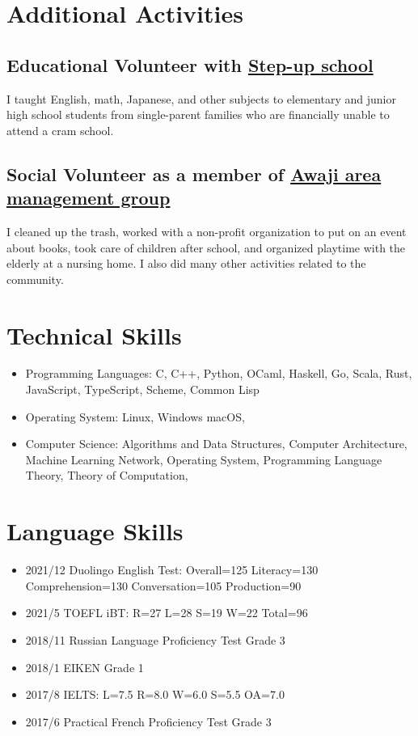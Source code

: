 \documentclass[12pt]{article}
\begin{document}
\section*{Additional Activities}
  \subsection*{Educational Volunteer with \href{https://stepup-unesco.com/}{Step-up school}}
    I taught English, math, Japanese, and other subjects to elementary and junior high school students from single-parent families who are financially unable to attend a cram school.
  \subsection*{Social Volunteer as a member of \href{https://www.waterras.com/awaji_am.html}{Awaji area management group}}
    I cleaned up the trash, worked with a non-profit organization to put on an event about books, took care of children after school, and organized playtime with the elderly at a nursing home.
    I also did many other activities related to the community.

\section*{Technical Skills}
    \begin{itemize}
      \item Programming Languages:
        C,
        C++,
        Python,
        OCaml,
        Haskell,
        Go,
        Scala,
        Rust,
        JavaScript,
        TypeScript,
        Scheme,
        Common Lisp
      \item Operating System:
        Linux,
        Windows
        macOS,
      \item Computer Science:
        Algorithms and Data Structures,
        Computer Architecture,
        Machine Learning
        Network,
        Operating System,
        Programming Language Theory,
        Theory of Computation,
    \end{itemize}

\section*{Language Skills}
  \begin{itemize}
    \item 2021/12 Duolingo English Test: Overall=125 Literacy=130 Comprehension=130 Conversation=105 Production=90
    \item 2021/5 TOEFL iBT: R=27 L=28 S=19 W=22 Total=96
    \item 2018/11 Russian Language Proficiency Test Grade 3
    \item 2018/1 EIKEN Grade 1
    \item 2017/8 IELTS: L=7.5 R=8.0 W=6.0 S=5.5 OA=7.0
    \item 2017/6 Practical French Proficiency Test Grade 3
  \end{itemize}
\end{document}
